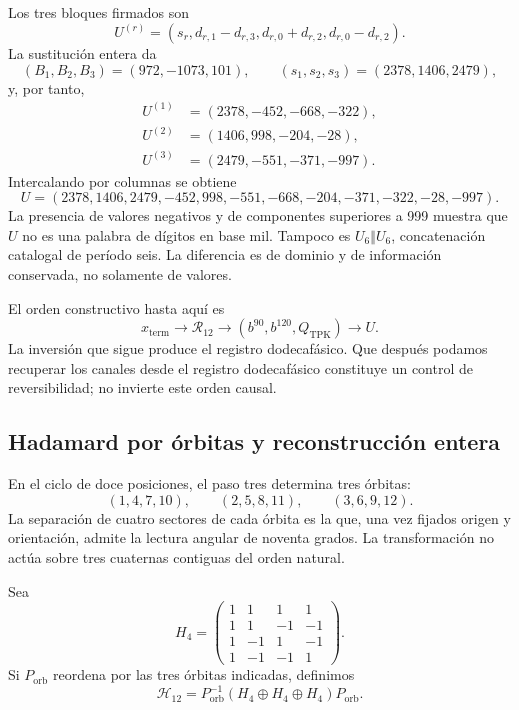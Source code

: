 Los tres bloques firmados son
\begin{equation}
 U^{(r)}=(s_r,d_{r,1}-d_{r,3},d_{r,0}+d_{r,2},d_{r,0}-d_{r,2}).
 \label{eq:k-bloques-firmados}
\end{equation}
La sustitución entera da
\[
 (B_1,B_2,B_3)=(972,-1073,101),\qquad
 (s_1,s_2,s_3)=(2378,1406,2479),
\]
y, por tanto,
\begin{align*}
 U^{(1)}&=(2378,-452,-668,-322),\\
 U^{(2)}&=(1406,998,-204,-28),\\
 U^{(3)}&=(2479,-551,-371,-997).
\end{align*}
Intercalando por columnas se obtiene
\begin{equation}
 U=(2378,1406,2479,-452,998,-551,
       -668,-204,-371,-322,-28,-997).
 \label{eq:k-u-firmado}
\end{equation}
La presencia de valores negativos y de componentes superiores a 999
muestra que \(U\) no es una palabra de dígitos en base mil. Tampoco es
\(U_6\Vert U_6\), concatenación catalogal de período seis. La diferencia
es de dominio y de información conservada, no solamente de valores.

El orden constructivo hasta aquí es
\[
 x_{\mathrm{term}}\longrightarrow\mathcal R_{12}
 \longrightarrow(b^{90},b^{120},Q_{\mathrm{TPK}})
 \longrightarrow U.
\]
La inversión que sigue produce el registro dodecafásico. Que después podamos recuperar
los canales desde el registro dodecafásico constituye un control de reversibilidad; no
invierte este orden causal.

\subsection{Hadamard por órbitas y reconstrucción entera}
\label{subsec:k-hadamard}

En el ciclo de doce posiciones, el paso tres determina tres órbitas:
\[
 (1,4,7,10),\qquad(2,5,8,11),\qquad(3,6,9,12).
\]
La separación de cuatro sectores de cada órbita es la que, una vez fijados
origen y orientación, admite la lectura angular de noventa grados. La
transformación no actúa sobre tres cuaternas contiguas del orden natural.

Sea
\[
 H_4=\begin{pmatrix}
 1&1&1&1\\1&1&-1&-1\\1&-1&1&-1\\1&-1&-1&1
 \end{pmatrix}.
\]
Si \(P_{\mathrm{orb}}\) reordena por las tres órbitas indicadas,
definimos
\[
 \mathcal H_{12}=P_{\mathrm{orb}}^{-1}
 (H_4\oplus H_4\oplus H_4)P_{\mathrm{orb}}.
\]

